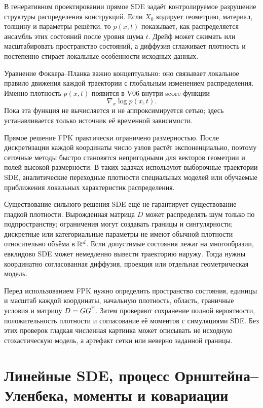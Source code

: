 В генеративном проектировании прямое SDE задаёт контролируемое разрушение структуры распределения конструкций. Если $X_0$ кодирует геометрию, материал, толщину и параметры решётки, то $p(x,t)$ показывает, как распределяется ансамбль этих состояний после уровня шума $t$. Дрейф может сжимать или масштабировать пространство состояний, а диффузия сглаживает плотность и постепенно стирает локальные особенности исходных данных.

Уравнение Фоккера--Планка важно концептуально: оно связывает локальное правило движения каждой траектории с глобальным изменением распределения. Именно плотность $p(x,t)$ появится в V06 внутри score-функции
\[
\nabla_x\log p(x,t).
\]
Пока эта функция не вычисляется и не аппроксимируется сетью; здесь устанавливается только источник её временной зависимости.

Прямое решение FPK практически ограничено размерностью. После дискретизации каждой координаты число узлов растёт экспоненциально, поэтому сеточные методы быстро становятся непригодными для векторов геометрии и полей высокой размерности. В таких задачах используют выборочные траектории SDE, аналитические переходные плотности специальных моделей или обучаемые приближения локальных характеристик распределения.

Существование сильного решения SDE ещё не гарантирует существование гладкой плотности. Вырожденная матрица $D$ может распределять шум только по подпространству; ограничения могут создавать границы и сингулярности; дискретные или категориальные параметры не имеют обычной плотности относительно объёма в $\mathbb{R}^d$. Если допустимые состояния лежат на многообразии, евклидово SDE может немедленно вывести траекторию наружу. Тогда нужны координатно согласованная диффузия, проекция или отдельная геометрическая модель.

\begin{application}
Перед использованием FPK нужно определить пространство состояния, единицы и масштаб каждой координаты, начальную плотность, область, граничные условия и матрицу $D=GG^{\mathsf{T}}$. Затем проверяют сохранение полной вероятности, положительность плотности и согласование её моментов с симуляциями SDE. Без этих проверок гладкая численная картинка может описывать не исходную стохастическую модель, а артефакт сетки или неверно заданной границы.
\end{application}

\section{Линейные SDE, процесс Орнштейна--Уленбека, моменты и ковариации}
\label{sec:linear-sde-ou-moments}

